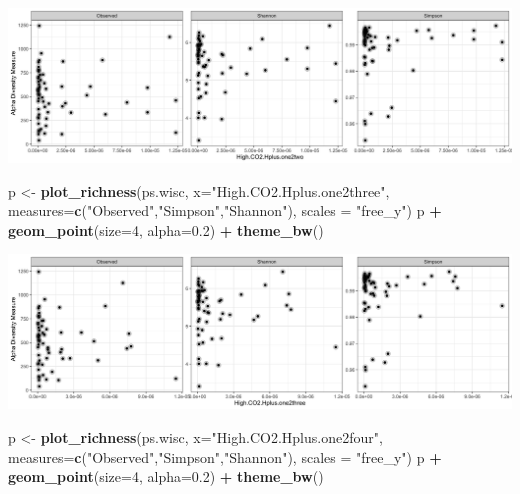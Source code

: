\documentclass[]{article}
\newenvironment{Shaded}{\begin{snugshade}}{\end{snugshade}}
\newcommand{\DataTypeTok}[1]{\textcolor[rgb]{0.13,0.29,0.53}{#1}}
\newcommand{\DecValTok}[1]{\textcolor[rgb]{0.00,0.00,0.81}{#1}}
\newcommand{\FloatTok}[1]{\textcolor[rgb]{0.00,0.00,0.81}{#1}}
\newcommand{\KeywordTok}[1]{\textcolor[rgb]{0.13,0.29,0.53}{\textbf{#1}}}
\newcommand{\NormalTok}[1]{#1}
\newcommand{\OperatorTok}[1]{\textcolor[rgb]{0.81,0.36,0.00}{\textbf{#1}}}
\newcommand{\StringTok}[1]{\textcolor[rgb]{0.31,0.60,0.02}{#1}}
\begin{document}
\includegraphics{output-rmd/richness-ph-High.CO2.Hplus.one2two.wisc-1.png}

\begin{Shaded}
\begin{Highlighting}[]
\NormalTok{p <-}\StringTok{ }\KeywordTok{plot_richness}\NormalTok{(ps.wisc, }\DataTypeTok{x=}\StringTok{"High.CO2.Hplus.one2three"}\NormalTok{, }\DataTypeTok{measures=}\KeywordTok{c}\NormalTok{(}\StringTok{"Observed"}\NormalTok{,}\StringTok{"Simpson"}\NormalTok{,}\StringTok{"Shannon"}\NormalTok{), }\DataTypeTok{scales =} \StringTok{"free_y"}\NormalTok{)}
\NormalTok{p }\OperatorTok{+}\StringTok{ }\KeywordTok{geom_point}\NormalTok{(}\DataTypeTok{size=}\DecValTok{4}\NormalTok{, }\DataTypeTok{alpha=}\FloatTok{0.2}\NormalTok{) }\OperatorTok{+}\StringTok{ }\KeywordTok{theme_bw}\NormalTok{()}
\end{Highlighting}
\end{Shaded}

\includegraphics{output-rmd/richness-ph-High.CO2.Hplus.one2three.wisc-1.png}

\begin{Shaded}
\begin{Highlighting}[]
\NormalTok{p <-}\StringTok{ }\KeywordTok{plot_richness}\NormalTok{(ps.wisc, }\DataTypeTok{x=}\StringTok{"High.CO2.Hplus.one2four"}\NormalTok{, }\DataTypeTok{measures=}\KeywordTok{c}\NormalTok{(}\StringTok{"Observed"}\NormalTok{,}\StringTok{"Simpson"}\NormalTok{,}\StringTok{"Shannon"}\NormalTok{), }\DataTypeTok{scales =} \StringTok{"free_y"}\NormalTok{)}
\NormalTok{p }\OperatorTok{+}\StringTok{ }\KeywordTok{geom_point}\NormalTok{(}\DataTypeTok{size=}\DecValTok{4}\NormalTok{, }\DataTypeTok{alpha=}\FloatTok{0.2}\NormalTok{) }\OperatorTok{+}\StringTok{ }\KeywordTok{theme_bw}\NormalTok{()}
\end{Highlighting}
\end{Shaded}
\end{document}
